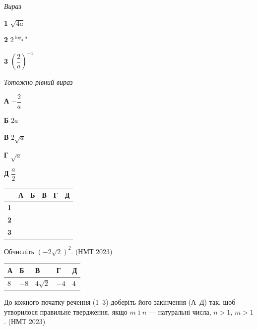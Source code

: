 \documentclass[14pt]{extarticle}
\newcommand{\answerTable}[5]{
\begin{center}
\begin{tabular}{|*{5}{>{\centering\arraybackslash}m{2.8cm}|}}
\hline
\rule[-0.3cm]{0pt}{0.8cm}\textbf{А} & \textbf{Б} & \textbf{В} & \textbf{Г} & \textbf{Д} \\
\hline
\rule[-0.4cm]{0pt}{1.0cm}#1 & \rule[-0.4cm]{0pt}{1.0cm}#2 & \rule[-0.4cm]{0pt}{1.0cm}#3 & \rule[-0.4cm]{0pt}{1.0cm}#4 & \rule[-0.4cm]{0pt}{1.0cm}#5 \\
\hline
\end{tabular}
\end{center}
}
\newcommand{\matchTable}{
\begin{tabular}{|>{\centering\arraybackslash}p{0.3cm}|*{5}{>{\centering\arraybackslash}p{0.3cm}|}}
\hline
& \textbf{А} & \textbf{Б} & \textbf{В} & \textbf{Г} & \textbf{Д} \\
\hline
\textbf{1} & \rule{0pt}{0.3cm} & & & & \\
\hline
\textbf{2} & \rule{0pt}{0.3cm} & & & & \\
\hline
\textbf{3} & \rule{0pt}{0.3cm} & & & & \\
\hline
\end{tabular}
}
\newcommand{\task}[2]{\noindent\makebox[1.5em][l]{\textbf{#1.}}\parbox[t]{\dimexpr\textwidth-1.5em}{#2}}
\newcommand{\nmtyear}[1]{\hfill{\small\color{yearcolor}(НМТ #1)}}
\begin{document}
\vspace{0.3cm}
\begin{minipage}{0.3\textwidth}
\textit{Вираз}

\vspace{0.2cm}
\textbf{1} \quad $\sqrt{4a}$

\vspace{0.3cm}
\textbf{2} \quad $2^{\log_4 a}$

\vspace{0.3cm}
\textbf{3} \quad $\left(\dfrac{2}{a}\right)^{-1}$
\end{minipage}
\hfill
\begin{minipage}{0.35\textwidth}
\textit{Тотожно рівний вираз}

\vspace{0.2cm}
\textbf{А} \quad $-\dfrac{2}{a}$

\vspace{0.3cm}
\textbf{Б} \quad $2a$

\vspace{0.2cm}
\textbf{В} \quad $2\sqrt{a}$

\vspace{0.2cm}
\textbf{Г} \quad $\sqrt{a}$

\vspace{0.3cm}
\textbf{Д} \quad $\dfrac{a}{2}$
\end{minipage}
\hfill
\begin{minipage}{0.2\textwidth}
\matchTable
\end{minipage}

\vspace{0.7cm}

\task{6}{Обчисліть $(-2\sqrt{2})^2$. \nmtyear{2023}}
\answerTable{$8$}{$-8$}{$4\sqrt{2}$}{$-4$}{$4$}

\vspace{0.5cm}

\task{7}{До кожного початку речення (1--3) доберіть його закінчення (А--Д) так, щоб утворилося правильне твердження, якщо $m$ і $n$ --- натуральні числа, $n > 1$, $m > 1$. \nmtyear{2023}}
\end{document}
